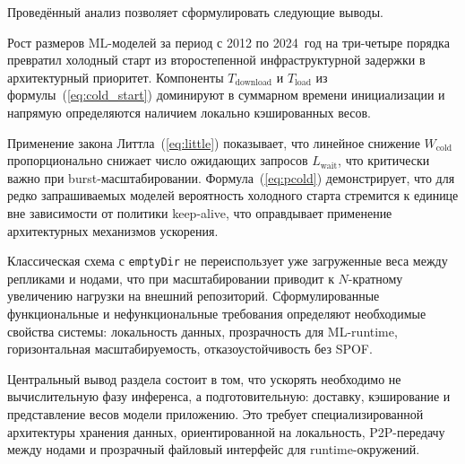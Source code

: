 Проведённый анализ позволяет сформулировать следующие выводы.

Рост размеров ML-моделей за период с 2012 по 2024~год на три-четыре порядка превратил холодный старт из второстепенной инфраструктурной задержки в архитектурный приоритет. Компоненты $T_{\mathrm{download}}$ и $T_{\mathrm{load}}$ из формулы~(\ref{eq:cold_start}) доминируют в суммарном времени инициализации и напрямую определяются наличием локально кэшированных весов.

Применение закона Литтла~(\ref{eq:little}) показывает, что линейное снижение $W_{\mathrm{cold}}$ пропорционально снижает число ожидающих запросов $L_{\mathrm{wait}}$, что критически важно при burst-масштабировании. Формула~(\ref{eq:pcold}) демонстрирует, что для редко запрашиваемых моделей вероятность холодного старта стремится к единице вне зависимости от политики keep-alive, что оправдывает применение архитектурных механизмов ускорения.

Классическая схема с \texttt{emptyDir} не переиспользует уже загруженные веса между репликами и нодами, что при масштабировании приводит к $N$-кратному увеличению нагрузки на внешний репозиторий. Сформулированные функциональные и нефункциональные требования определяют необходимые свойства системы: локальность данных, прозрачность для ML-runtime, горизонтальная масштабируемость, отказоустойчивость без SPOF.

Центральный вывод раздела состоит в том, что ускорять необходимо не вычислительную фазу инференса, а подготовительную: доставку, кэширование и представление весов модели приложению. Это требует специализированной архитектуры хранения данных, ориентированной на локальность, P2P-передачу между нодами и прозрачный файловый интерфейс для runtime-окружений.
